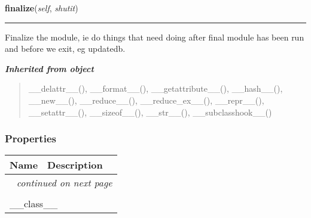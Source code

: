 \hspace{.8\funcindent}\begin{boxedminipage}{\funcwidth}

    \raggedright \textbf{finalize}(\textit{self}, \textit{shutit})

    \vspace{-1.5ex}

    \rule{\textwidth}{0.5\fboxrule}
\setlength{\parskip}{2ex}
    Finalize the module, ie do things that need doing after final module 
    has been run and before we exit, eg updatedb.

\setlength{\parskip}{1ex}
    \end{boxedminipage}


\large{\textbf{\textit{Inherited from object}}}

\begin{quote}
\_\_delattr\_\_(), \_\_format\_\_(), \_\_getattribute\_\_(), \_\_hash\_\_(), \_\_new\_\_(), \_\_reduce\_\_(), \_\_reduce\_ex\_\_(), \_\_repr\_\_(), \_\_setattr\_\_(), \_\_sizeof\_\_(), \_\_str\_\_(), \_\_subclasshook\_\_()
\end{quote}


  \subsubsection{Properties}

    \vspace{-1cm}
\hspace{\varindent}\begin{longtable}{|p{\varnamewidth}|p{\vardescrwidth}|l}
\cline{1-2}
\cline{1-2} \centering \textbf{Name} & \centering \textbf{Description}& \\
\cline{1-2}
\endhead\cline{1-2}\multicolumn{3}{r}{\small\textit{continued on next page}}\\\endfoot\cline{1-2}
\endlastfoot\multicolumn{2}{|l|}{\textit{Inherited from object}}\\
\multicolumn{2}{|p{\varwidth}|}{\raggedright \_\_class\_\_}\\
\cline{1-2}
\end{longtable}



